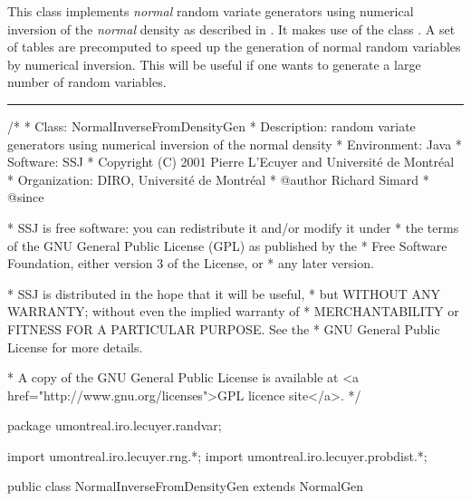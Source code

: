 
This class implements \emph{normal} random variate generators
 using numerical inversion of the \emph{normal} density
 as described in \cite{rDER10a}.  It makes use of the class
.
A set of tables are precomputed to speed up the generation of normal random 
variables by numerical inversion. This will be useful if one 
wants to generate a large number of random variables.


\bigskip\hrule

\begin{code}
\begin{hide}
/*
 * Class:        NormalInverseFromDensityGen
 * Description:  random variate generators using numerical inversion of
                 the normal density
 * Environment:  Java
 * Software:     SSJ 
 * Copyright (C) 2001  Pierre L'Ecuyer and Université de Montréal
 * Organization: DIRO, Université de Montréal
 * @author       Richard Simard
 * @since

 * SSJ is free software: you can redistribute it and/or modify it under
 * the terms of the GNU General Public License (GPL) as published by the
 * Free Software Foundation, either version 3 of the License, or
 * any later version.

 * SSJ is distributed in the hope that it will be useful,
 * but WITHOUT ANY WARRANTY; without even the implied warranty of
 * MERCHANTABILITY or FITNESS FOR A PARTICULAR PURPOSE.  See the
 * GNU General Public License for more details.

 * A copy of the GNU General Public License is available at
   <a href="http://www.gnu.org/licenses">GPL licence site</a>.
 */
\end{hide}
package umontreal.iro.lecuyer.randvar;\begin{hide}
import umontreal.iro.lecuyer.rng.*;
import umontreal.iro.lecuyer.probdist.*;
\end{hide}

public class NormalInverseFromDensityGen extends NormalGen \begin{hide} {

\end{hide}\end{code}

